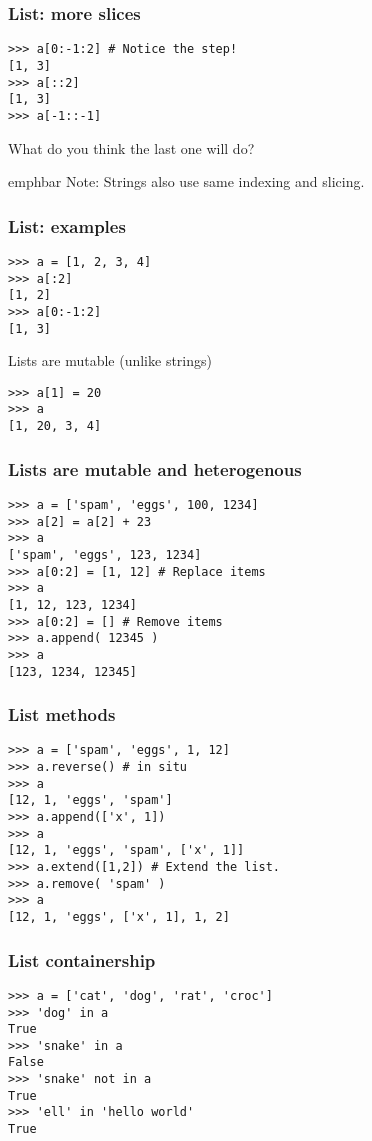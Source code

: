 \documentclass[14pt,compress]{beamer}
\newcommand{\emphbar}[1]
{\begin{beamercolorbox}[rounded=true]{emphbar} 
      {#1}
 \end{beamercolorbox}
}
\begin{document}
\begin{frame}[fragile]
  \frametitle{List: more slices}
\begin{lstlisting}
>>> a[0:-1:2] # Notice the step!
[1, 3]
>>> a[::2]
[1, 3]
>>> a[-1::-1]
\end{lstlisting}
What do you think the last one will do?
  \emphbar{Note: Strings also use same indexing and slicing.}
\end{frame}

\begin{frame}[fragile]
  \frametitle{List: examples}
\begin{lstlisting}
>>> a = [1, 2, 3, 4]
>>> a[:2]
[1, 2]
>>> a[0:-1:2]
[1, 3]
\end{lstlisting}
\pause
\alert{Lists are mutable (unlike strings)}
\begin{lstlisting}
>>> a[1] = 20
>>> a
[1, 20, 3, 4]
\end{lstlisting}
\end{frame}

\begin{frame}[fragile]
  \frametitle{Lists are mutable and heterogenous}
\begin{lstlisting}
>>> a = ['spam', 'eggs', 100, 1234]
>>> a[2] = a[2] + 23
>>> a
['spam', 'eggs', 123, 1234]
>>> a[0:2] = [1, 12] # Replace items
>>> a
[1, 12, 123, 1234]
>>> a[0:2] = [] # Remove items
>>> a.append( 12345 )
>>> a
[123, 1234, 12345]
\end{lstlisting}
\end{frame}

\begin{frame}[fragile]
  \frametitle{List methods}
\begin{lstlisting}
>>> a = ['spam', 'eggs', 1, 12]
>>> a.reverse() # in situ
>>> a
[12, 1, 'eggs', 'spam']
>>> a.append(['x', 1])
>>> a
[12, 1, 'eggs', 'spam', ['x', 1]]
>>> a.extend([1,2]) # Extend the list.
>>> a.remove( 'spam' )
>>> a
[12, 1, 'eggs', ['x', 1], 1, 2]
\end{lstlisting}
\end{frame}

\begin{frame}[fragile]
  \frametitle{List containership}
  \begin{lstlisting}
>>> a = ['cat', 'dog', 'rat', 'croc']
>>> 'dog' in a
True
>>> 'snake' in a
False
>>> 'snake' not in a
True
>>> 'ell' in 'hello world'
True
  \end{lstlisting}
\end{frame}
\end{document}

